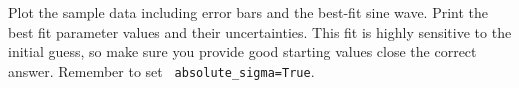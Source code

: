 \begin{plot}
Plot the sample data including error bars and the best-fit sine wave.  Print
the best fit parameter values and their uncertainties.  This fit is
highly sensitive to the initial guess, so make sure you provide good
starting values close the correct answer.  Remember to set {\tt
  absolute{\_}sigma=True}.
\end{plot}


